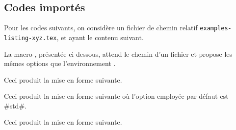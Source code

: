 \documentclass[10pt, a4paper]{../main/main}
\begin{document}
\subsection{Codes importés}

Pour les codes suivants, on considère un fichier de chemin relatif \verb+examples-listing-xyz.tex+, et ayant le contenu suivant.


\medskip

La macro , présentée ci-dessous, attend le chemin d'un fichier et propose les mêmes options que l'environnement .




\begin{tdocexa}
    \leavevmode

    \begin{tdoclatex}[code]
    \end{tdoclatex}

    Ceci produit la mise en forme suivante.

\end{tdocexa}




\begin{tdocexa}[À la suite]
    \leavevmode

    \begin{tdoclatex}[code]
    \end{tdoclatex}

    Ceci produit la mise en forme suivante où l'option employée par défaut est \tdocinlatex#std#.

\end{tdocexa}




\begin{tdocexa}
    \leavevmode

    \begin{tdoclatex}[code]
    \end{tdoclatex}

    Ceci produit la mise en forme suivante.

\end{tdocexa}
\end{document}
